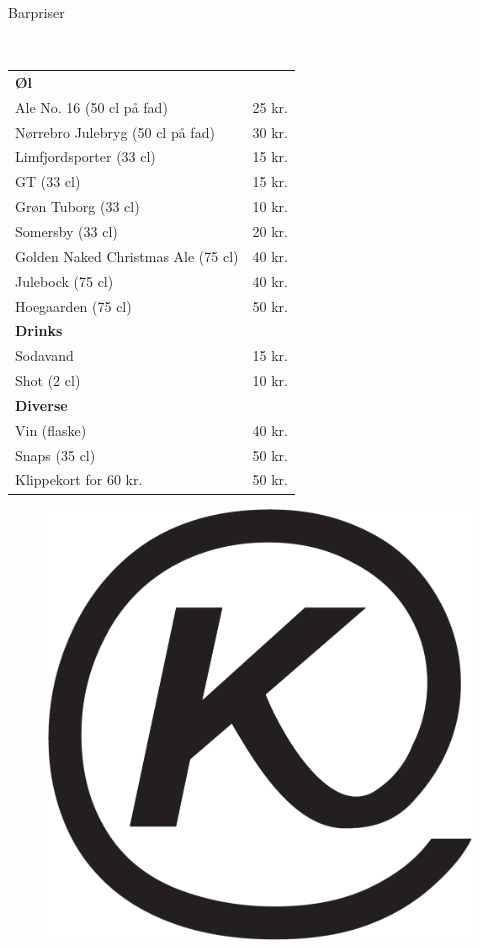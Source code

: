 \begin{flushleft}
\begin{huge}
Barpriser
\end{huge}
\\[.1cm]
\begin{table}[h!]
\begin{tabular}{p{} p{}}
\textbf{Øl} & \\
Ale No. 16 (50 cl på fad) & 25 kr.\\
Nørrebro Julebryg (50 cl på fad) & 30 kr.\\
Limfjordsporter (33 cl) & 15 kr.\\
GT (33 cl) & 15 kr.\\
Grøn Tuborg (33 cl) & 10 kr.\\
Somersby (33 cl) & 20 kr. \\
Golden Naked Christmas Ale (75 cl) & 40 kr.\\
Julebock (75 cl) & 40 kr.\\
Hoegaarden (75 cl) & 50 kr.\\[2ex]
\textbf{Drinks} & \\
Sodavand & 15 kr.\\
Shot (2 cl) & 10 kr.\\[2ex]
\textbf{Diverse} & \\
Vin (flaske) & 40 kr.\\
Snaps (35 cl) & 50 kr.\\
Klippekort for 60 kr. & 50 kr.\\
\end{tabular}
\end{table}
\end{flushleft}
\begin{figure}[h!]
    \begin{center}
    \includegraphics[width=.45\linewidth]{../logo.pdf}
\end{center}
\end{figure}

